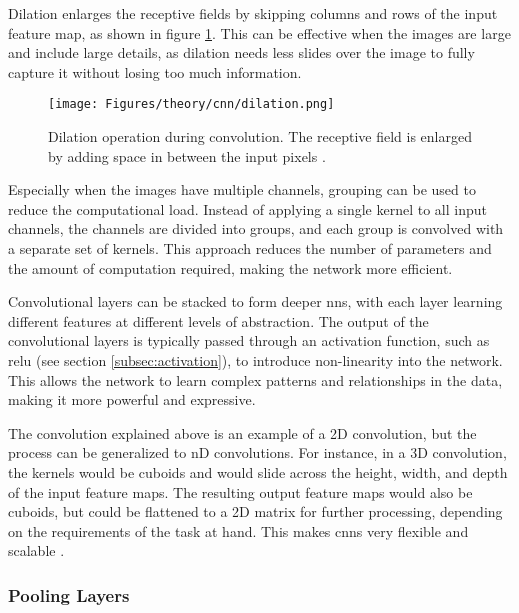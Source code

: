 Dilation enlarges the receptive fields by skipping columns and rows of the input feature map, as shown in figure \ref{fig:dilation}. This can be effective when the images are large and include large details, as dilation needs less slides over the image to fully capture it without losing too much information.

\begin{figure}[htb]
    \centering
    \texttt{[image: Figures/theory/cnn/dilation.png]}
    \caption[Dilation]{Dilation operation during convolution. The receptive field is enlarged by adding space in between the input pixels \autocite{Dumoulin.Visin2018}.}
    \label{fig:dilation}
\end{figure}

Especially when the images have multiple channels, grouping can be used to reduce the computational load. Instead of applying a single kernel to all input channels, the channels are divided into groups, and each group is convolved with a separate set of kernels. This approach reduces the number of parameters and the amount of computation required, making the network more efficient.

Convolutional layers can be stacked to form deeper \glspl{nn}, with each layer learning different features at different levels of abstraction. The output of the convolutional layers is typically passed through an activation function, such as \gls{relu} (see section \ref{subsec:activation}), to introduce non-linearity into the network. This allows the network to learn complex patterns and relationships in the data, making it more powerful and expressive.

The convolution explained above is an example of a 2D convolution, but the process can be generalized to nD convolutions. For instance, in a 3D convolution, the kernels would be cuboids and would slide across the height, width, and depth of the input feature maps. The resulting output feature maps would also be cuboids, but could be flattened to a 2D matrix for further processing, depending on the requirements of the task at hand. This makes \glspl{cnn} very flexible and scalable \autocite{Dumoulin.Visin2018}.

\subsubsection*{Pooling Layers}

